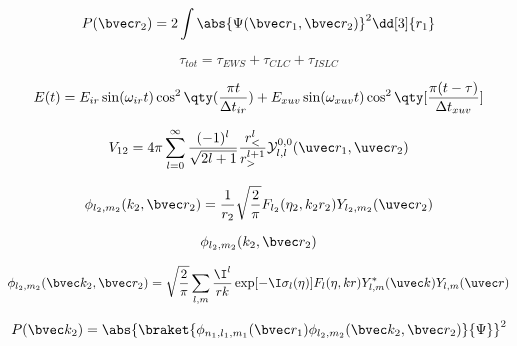\begin{equation}
P(\bvec r_2) = 2\int \abs{\Psi(\bvec r_1, \bvec r_2)}^2 \dd[3]{r_1}
\end{equation}

\begin{equation}
\tau_{tot} = \tau_{EWS} + \tau_{CLC} + \tau_{ISLC}
\end{equation}


\begin{equation}
E(t) = E_{ir} \sin(\omega_{ir} t) \cos^2\qty(\frac{\pi t}{\Delta t_{ir}})
+ E_{xuv} \sin(\omega_{xuv} t) \cos^2\qty[\frac{\pi(t-\tau)}{\Delta t_{xuv}}]
\end{equation}

\begin{equation}
V_{12} = 4\pi \sum_{l=0}^{\infty} \frac{(-1)^l}{\sqrt{2l + 1}} \frac{r_<^l}{r_>^{l+1}} \mathcal{Y}_{l,l}^{0,0} (\uvec r_1, \uvec r_2)
\end{equation}

\begin{equation}
\phi_{l_2, m_2}(k_2, \bvec r_2) = \frac{1}{r_2}\sqrt{\frac{2}{\pi}} F_{l_2}(\eta_2, k_2 r_2) Y_{l_2, m_2} (\uvec r_2)
\end{equation}

\begin{equation}
\phi_{l_2, m_2}(k_2, \bvec r_2)
\end{equation}

\begin{equation}
\phi_{l_2, m_2} (\bvec k_2, \bvec r_2) = \sqrt{\frac{2}{\pi}} \sum_{l,m} \frac{\I^l}{rk} \exp[-\I\sigma_l(\eta)] F_l(\eta, kr) Y_{l,m}^*(\uvec k) Y_{l,m}(\uvec r)
\end{equation}

\begin{equation}
P(\bvec k_2) = \abs{\braket{\phi_{n_1,l_1,m_1}(\bvec r_1) \phi_{l_2,m_2}(\bvec k_2, \bvec r_2)}{\Psi}}^2
\end{equation}
